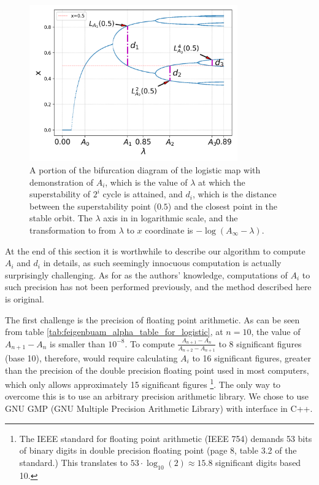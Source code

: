 \begin{figure}
	\centering
	\includegraphics[width=0.8\textwidth]{./figures/demonstration of feigenbaum constants.png}
	\caption{ 
		A portion of the bifurcation diagram of the logistic map with demonstration of  $A_i$, which is the value of $\lambda$ at which the superstability of $2^i$ cycle is attained, and $d_i$, which is the distance between the superstability point ($0.5$) and the closest point in the stable orbit.
		The $\lambda$ axis in in logarithmic scale, and the transformation to from $\lambda$ to $x$ coordinate is $-\log(A_{\infty} - \lambda)$.
	}
	\label{fig:demonstration of feigenbaum constants on logistic map}
\end{figure}

At the end of this section it is worthwhile to describe our algorithm to compute $A_i$ and $d_i$ in details, as such seemingly innocuous computation is actually surprisingly challenging.
As for as the authors' knowledge, computations of $A_i$ to such precision has not been performed previously, and the method described here is original.

The first challenge is the precision of floating point arithmetic.
As can be seen from table \ref{tab:feigenbuam_alpha_table_for_logistic}, at $n = 10$, the value of $A_{n+1} -A_{n} $ is smaller than $ 10^{-8}$. 
To compute $\frac{A_{n+1} - A_n}{A_{n+2} - A_{n+1}}$ to $8$ significant figures (base 10), therefore, would require calculating $A_i$ to 16 significant figures, greater than the precision of the double precision floating point used in most computers, which only allows approximately 15 significant figures
\footnote{
	The IEEE standard for floating point arithmetic \cite{IEEE_floating_point} (IEEE 754) demands 53 bits of binary digits in double precision floating point (page 8, table 3.2 of the standard.) This translates to $53 \cdot \log_{10}(2) \approx 15.8$ significant digits based 10.
}.
The only way to overcome this is to use an arbitrary precision arithmetic library. 
We chose to use GNU GMP (GNU Multiple Precision Arithmetic Library) \cite{GMP} with interface in C++.

